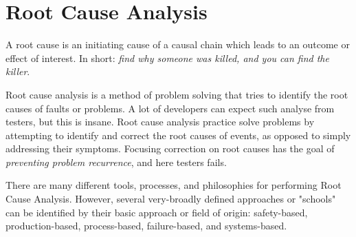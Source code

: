 \section{Root Cause Analysis}
\label{sec:Root Cause Analysis}

A root cause is an initiating cause of a causal chain which leads to an outcome or effect of interest. In short: \textit{find why someone was killed, and you can find the killer}.

Root cause analysis is a method of problem solving that tries to identify the root causes of faults or problems. A lot of developers can expect such analyse from testers, but this is insane. Root cause analysis practice solve problems by attempting to identify and correct the root causes of events, as opposed to simply addressing their symptoms. Focusing correction on root causes has the goal of \emph{preventing problem recurrence}, and here testers fails.

There are many different tools, processes, and philosophies for performing Root Cause Analysis. However, several very-broadly defined approaches or "schools" can be identified by their basic approach or field of origin: safety-based, production-based, process-based, failure-based, and systems-based.
